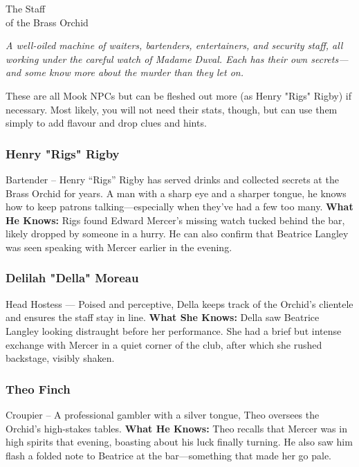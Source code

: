 \begin{NPC}[description=The people who keep the Orchid running]{The Staff\\ of the Brass Orchid}
	
    \emph{A well-oiled machine of waiters, bartenders, entertainers, and security staff, all working under the careful watch of Madame Duval. Each has their own secrets—and some know more about the murder than they let on.}
    
	\vspace{0.8\baselineskip}
    \begin{GmTips}[background=bgtan]
    These are all Mook NPCs but can be fleshed out more (as Henry "Rigs" Rigby) if necessary. Most likely, you will not need their stats, though, but can use them simply to add flavour and drop clues and hints.
    \end{GmTips}
    
    \subsubsection*{Henry "Rigs" Rigby}
    Bartender – Henry “Rigs” Rigby has served drinks and collected secrets at the Brass Orchid for years. A man with a sharp eye and a sharper tongue, he knows how to keep patrons talking—especially when they’ve had a few too many.
    \textbf{What He Knows:} Rigs found Edward Mercer’s missing watch tucked behind the bar, likely dropped by someone in a hurry. He can also confirm that Beatrice Langley was seen speaking with Mercer earlier in the evening.

    
	\subsubsection*{Delilah "Della" Moreau}
	Head Hostess --- Poised and perceptive, Della keeps track of the Orchid’s clientele and ensures the staff stay in line.  
	\textbf{What She Knows:} Della saw Beatrice Langley looking distraught before her performance. She had a brief but intense exchange with Mercer in a quiet corner of the club, after which she rushed backstage, visibly shaken.

	\subsubsection*{Theo Finch}
	Croupier – A professional gambler with a silver tongue, Theo oversees the Orchid’s high-stakes tables.
	\textbf{What He Knows:} Theo recalls that Mercer was in high spirits that evening, boasting about his luck finally turning. He also saw him flash a folded note to Beatrice at the bar—something that made her go pale.


\end{NPC}
